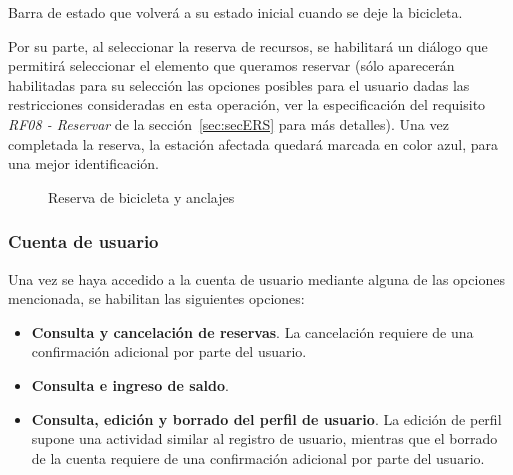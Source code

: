 \FloatBarrier
Barra de estado que volverá a su estado inicial cuando se deje la bicicleta.

Por su parte, al seleccionar la reserva de recursos, se habilitará un diálogo que permitirá seleccionar el elemento que queramos reservar (sólo aparecerán habilitadas para su selección las opciones posibles para el usuario dadas las restricciones consideradas en esta operación, ver la especificación del requisito \emph{RF08 - Reservar} de la sección~\ref{sec:secERS} para más detalles). Una vez completada la reserva, la estación afectada quedará marcada en color azul, para una mejor identificación.

\begin{figure} [!htb]
	\centering
	\caption{Reserva de bicicleta y anclajes}
	\label{fig:reservaBicisAnclajes}
\end{figure}

\subsubsection{Cuenta de usuario}

Una vez se haya accedido a la cuenta de usuario mediante alguna de las opciones mencionada, se habilitan las siguientes opciones:

\begin{itemize}
	\item \textbf{Consulta y cancelación de reservas}. La cancelación requiere de una confirmación adicional por parte del usuario.
	\item \textbf{Consulta e ingreso de saldo}.
	\item \textbf{Consulta, edición y borrado del perfil de usuario}. La edición de perfil supone una actividad similar al registro de usuario, mientras que el borrado de la cuenta requiere de una confirmación adicional por parte del usuario.
\end{itemize}

